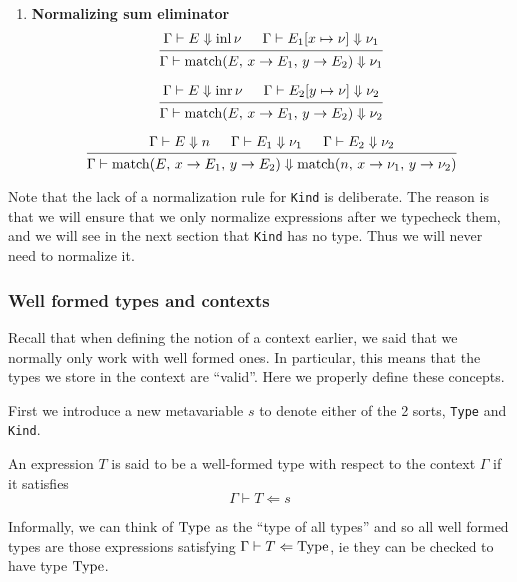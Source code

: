\documentclass{article}
\begin{document}
\begin{enumerate}
  \item \textbf{Normalizing sum eliminator}
  \[
    \begin{prooftree}
      \hypo{\Gamma \vdash E \Downarrow \inl \nu}
      \hypo{\Gamma \vdash E_1[x \mapsto \nu] \Downarrow \nu_1}
      \infer2{\Gamma \vdash 
        \match(E, \, x \rightarrow E_1, \, y \rightarrow E_2)
        \Downarrow \nu_1}
    \end{prooftree}  
  \]

  \[
   \begin{prooftree}
     \hypo{\Gamma \vdash E \Downarrow \inr \nu}
     \hypo{\Gamma \vdash E_2[y \mapsto \nu] \Downarrow \nu_2}
     \infer2{\Gamma \vdash 
       \match(E, \, x \rightarrow E_1, \, y \rightarrow E_2)
       \Downarrow \nu_2}
   \end{prooftree}  
  \]

  \[
   \begin{prooftree}
    \hypo{\Gamma \vdash E \Downarrow n}
      \hypo{\Gamma \vdash E_1 \Downarrow \nu_1}
      \hypo{\Gamma \vdash E_2 \Downarrow \nu_2}
      \infer3{\Gamma \vdash \match(E, \, x \rightarrow E_1, \, y \rightarrow E_2) 
               \Downarrow
               \match(n, \, x \rightarrow \nu_1, \, y \rightarrow \nu_2) 
               }
   \end{prooftree}  
  \]

\end{enumerate}

Note that the lack of a normalization rule for \verb|Kind| is deliberate.
The reason is that we will ensure that we only normalize expressions after we
typecheck them, and we will see in the next section that \verb|Kind| has no
type. Thus we will never need to normalize it.

\subsubsection{Well formed types and contexts}
Recall that when defining the notion of a context earlier, we said that we
normally only work with well formed ones. In particular, this means that the
types we store in the context are ``valid''. Here we properly define these
concepts.

First we introduce a new metavariable $s$ to denote either of the 2 sorts,
\verb|Type| and \verb|Kind|. 

\begin{definition} 
  An expression $T$ is said to be a well-formed type with respect to the context
  $\Gamma$ if it satisfies
  \[ \Gamma \vdash T \Leftarrow s \]

  Informally, we can think of $\operatorname{Type}$ as the ``type of all types'' and so
  all well formed types are those expressions satisfying
  $\Gamma \vdash T \Leftarrow \operatorname{Type}$, ie they can be checked to have type $\operatorname{Type}$.

\end{definition}
\end{document}
